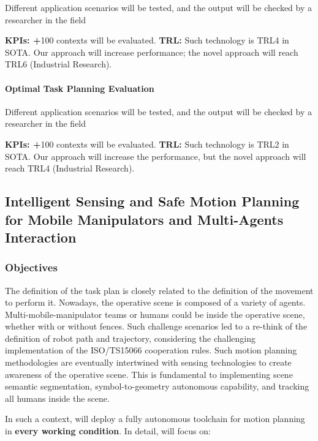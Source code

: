 Different application scenarios will be tested, and the output will be
checked by a researcher in the field

\textbf{KPIs: +}100 contexts will be evaluated. \textbf{\textbar{} TRL:}
Such technology is TRL4 in SOTA. Our approach will increase performance;
the novel approach will reach TRL6 (Industrial Research).

\paragraph{Optimal Task Planning
Evaluation}\label{optimal-task-planning-evaluation}

Different application scenarios will be tested, and the output will be
checked by a researcher in the field

\textbf{KPIs: +}100 contexts will be evaluated. \textbf{\textbar{} TRL:}
Such technology is TRL2 in SOTA. Our approach will increase the
performance, but the novel approach will reach TRL4 (Industrial
Research).

\clearpage
\subsection{Intelligent Sensing and Safe Motion Planning for Mobile
Manipulators and Multi-Agents
Interaction}\label{intelligent-sensing-and-safe-motion-planning-for-mobile-manipulators-and-multi-agents-interaction}

\subsubsection{\texorpdfstring{Objectives
}{Objectives }}\label{objectives-1}

The definition of the task plan is closely related to the definition of
the movement to perform it. Nowadays, the operative scene is composed of
a variety of agents. Multi-mobile-manipulator teams or humans could be
inside the operative scene, whether with or without fences. Such
challenge scenarios led to a re-think of the definition of robot path
and trajectory, considering the challenging implementation of the
ISO/TS15066 cooperation rules. Such motion planning methodologies are
eventually intertwined with sensing technologies to create awareness of
the operative scene. This is fundamental to implementing scene semantic
segmentation, symbol-to-geometry autonomous capability, and tracking all
humans inside the scene.

In such a context,  will deploy a fully autonomous
toolchain for motion planning in \textbf{every working condition}. In
detail,  will focus on:


